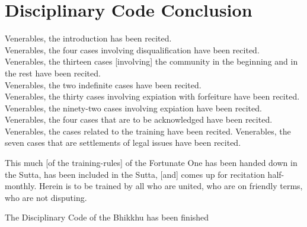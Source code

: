
\section{Disciplinary Code Conclusion}
\label{conclusion}

Venerables, the introduction has been recited.\\
Venerables, the four cases involving disqualification have been recited.\\
Venerables, the thirteen cases [involving] the community in the beginning and in the rest have been recited.\\
Venerables, the two indefinite cases have been recited.\\
Venerables, the thirty cases involving expiation with forfeiture have been recited.\\
Venerables, the ninety-two cases involving expiation have been recited.\\
Venerables, the four cases that are to be acknowledged have been recited.\\
Venerables, the cases related to the training have been recited. Venerables, the seven cases that are settlements of legal issues have been recited.

This much [of the training-rules] of the Fortunate One has been handed down in the Sutta, has been included in the Sutta, [and] comes up for recitation half-monthly. Herein is to be trained by all who are united, who are on friendly terms, who are not disputing.

\begin{outro}
	The Disciplinary Code of the Bhikkhu has been finished
\end{outro}

\clearpage


